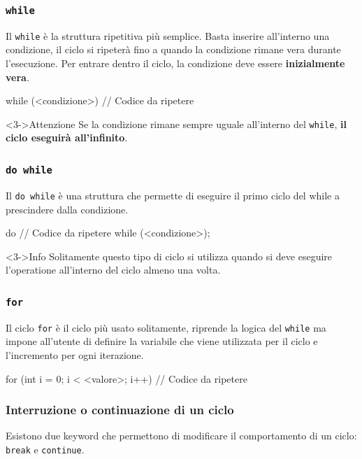 \documentclass{beamer}
\begin{document}
    \begin{frame}[fragile]
        \frametitle{\texttt{while}}
        Il \texttt{while} è la struttura ripetitiva più semplice. Basta inserire all'interno una condizione, il ciclo si ripeterà fino a quando la condizione rimane vera durante l'esecuzione. Per entrare dentro il ciclo, la condizione deve essere \textbf{inizialmente vera}.
        \begin{cppcode}
            while (<condizione>) {
                // Codice da ripetere
            }
        \end{cppcode}
        \begin{alertblock}<3->{Attenzione}
            Se la condizione rimane sempre uguale all'interno del \texttt{while}, \textbf{il ciclo eseguirà all'infinito}.
        \end{alertblock}
    \end{frame}

    \begin{frame}[fragile]
        \frametitle{\texttt{do while}}
        Il \texttt{do while} è una struttura che permette di eseguire il primo ciclo del while a prescindere dalla condizione.
        \begin{cppcode}
            do {
                // Codice da ripetere
            } while (<condizione>);
        \end{cppcode}
        \begin{block}<3->{Info}
            Solitamente questo tipo di ciclo si utilizza quando si deve eseguire l'operatione all'interno del ciclo almeno una volta. 
        \end{block}
    \end{frame}

    \begin{frame}[fragile]
        \frametitle{\texttt{for}}
        Il ciclo \texttt{for} è il ciclo più usato solitamente, riprende la logica del \texttt{while} ma impone all'utente di definire la variabile che viene utilizzata per il ciclo e l'incremento per ogni iterazione.
        \begin{cppcode}
            for (int i = 0; i < <valore>; i++) {
                // Codice da ripetere
            }
        \end{cppcode}
    \end{frame}

    \begin{frame}[fragile]
        \frametitle{Interruzione o continuazione di un ciclo}
        Esistono due keyword che permettono di modificare il comportamento di un ciclo: \texttt{break} e \texttt{continue}.
    \end{frame}
\end{document}
